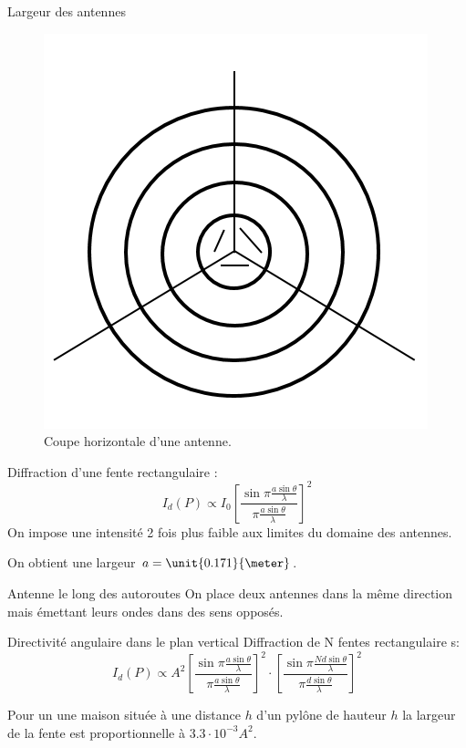 \documentclass[pdf]{beamer}
\begin{document}
\begin{frame}{Largeur des antennes}
	\begin{figure}[ht!] 
		\centering  
		\includegraphics[scale=0.30]{antennes.png}  
		\caption{Coupe horizontale d'une antenne.}  
	\end{figure}  
 	
	Diffraction d'une fente rectangulaire :
	$$I_d (P) \propto I_0 \left[\frac{\sin\pi\frac{a\sin\theta}{\lambda}}{\pi\frac{a\sin\theta}{\lambda}}\right]^2$$
	On impose une intensité 2 fois plus faible aux limites du domaine des antennes.

	On obtient une largeur $a = \unit{0.171}{\meter}$.
\end{frame}

\begin{frame}{Antenne le long des autoroutes}
	On place deux antennes dans la même direction mais émettant leurs ondes dans des sens opposés.
\end{frame}

\begin{frame}{Directivité angulaire dans le plan vertical}
	Diffraction de N fentes rectangulaire s:
	$$I_d (P)\propto A^2 \left[\frac{\sin \pi \frac{a \sin \theta}{\lambda}}{\pi \frac{a \sin \theta}{\lambda}}\right]^2  
	\cdot \left[  \frac{\sin \pi \frac{N d \sin \theta}{\lambda}}{\pi \frac{d \sin \theta}{\lambda}}\right]^2$$

	Pour un une maison située à une distance $h$ d'un pylône de hauteur $h$ la largeur de la fente est proportionnelle à $3.3 \cdot 10^{-3}A^2$.
\end{frame}
\end{document}
